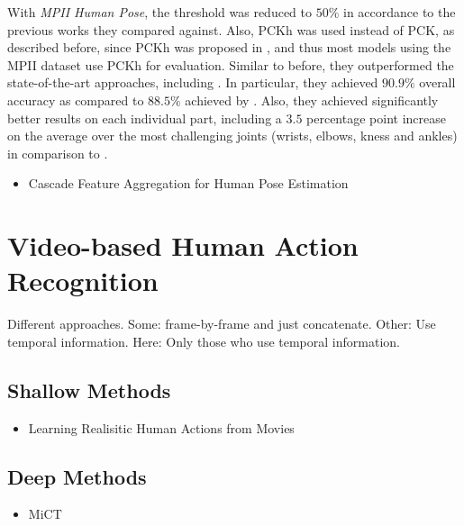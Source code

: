 With \textit{MPII Human Pose}, the threshold was reduced to $50\%$ in accordance to the previous works they compared against.
Also, PCKh was used instead of PCK, as described before, since PCKh was proposed in \cite{andriluka_2d_2014}, and thus most models using the MPII dataset use PCKh for evaluation.
Similar to before, they outperformed the state-of-the-art approaches, including \cite{wei_convolutional_2016}.
In particular, they achieved $90.9\%$ overall accuracy as compared to $88.5\%$ achieved by \cite{wei_convolutional_2016}.
Also, they achieved significantly better results on each individual part, including a $3.5$ percentage point increase on the average over the most challenging joints (wrists, elbows, kness and ankles) in comparison to \cite{wei_convolutional_2016}. 


\begin{itemize}
    \item Cascade Feature Aggregation for Human Pose Estimation \cite{su_cascade_2019}
\end{itemize}

\section{Video-based Human Action Recognition}

Different approaches.
Some: frame-by-frame and just concatenate.
Other: Use temporal information.
Here: Only those who use temporal information.

\subsection{Shallow Methods}
\begin{itemize}
    \item Learning Realisitic Human Actions from Movies \cite{laptev_learning_2008}
\end{itemize}

\subsection{Deep Methods}
\begin{itemize}
    \item MiCT \cite{zhou_mict:_2018}
\end{itemize}